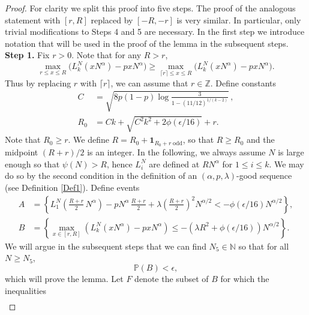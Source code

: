 	\begin{proof}
		
		For clarity we split this proof into five steps. The proof of the analogous statement with $[r,R]$ replaced by $[-R,-r]$ is very similar. In particular, only trivial modifications to Steps 4 and 5 are necessary. In the first step we introduce notation that will be used in the proof of the lemma in the subsequent steps.\\
		
		\noindent\textbf{Step 1.} Fix $r>0$. Note that for any $R>r$,
		\[
		\max_{r\leq x\leq R} \big(L_k^N(xN^\alpha) - pxN^\alpha\big) \geq \max_{\lceil r\rceil \leq x \leq R} \big(L_k^N(xN^\alpha) - pxN^\alpha\big).
		\]
		Thus by replacing $r$ with $\lceil r\rceil$, we can assume that $r\in\mathbb{Z}$. Define constants
		\begin{align}
		C &= \sqrt{ 8p(1-p) \log\frac{3}{1-(11/12)^{1/(k-2)}}}\,,\label{21Cdef}\\
		R_0 &= Ck+\sqrt{C^{2}k^{2}+2\phi(\epsilon/16)}+r. \label{21Rdef}
		\end{align}
		Note that $R_0\geq r$. We define $R = R_0 + \mathbf{1}_{R_0 + r\;\mathrm{odd}}$, so that $R\geq R_0$ and the midpoint $(R+r)/2$ is an integer. In the following, we always assume $N$ is large enough so that $\psi(N) > R$, hence $L_i^N$ are defined at $RN^\alpha$ for $1\leq i\leq k$. We may do so by the second condition in the definition of an $(\alpha,p,\lambda)$-good sequence (see Definition \ref{Def1}). Define events
		\begin{equation}\label{21AB}
		\begin{split}
		A &= \left\{L_1^N\left(\frac{R+r}{2}\,N^\alpha\right) - pN^\alpha\,\frac{R+r}{2} + \lambda\left(\frac{R+r}{2}\right)^2 N^{\alpha/2} < -\phi(\epsilon/16)N^{\alpha/2}\right\},\\
		B &= \left\{\max_{x\in[r,R]} \left(L_k^N(xN^\alpha) - pxN^\alpha\right) \leq -(\lambda R^2 + \phi(\epsilon/16)) N^{\alpha/2} \right\}.
		\end{split}
		\end{equation}
		We will argue in the subsequent steps that we can find $N_5\in\mathbb{N}$ so that for all $N\geq N_5$,
		\begin{equation}\label{21Bbound}
		\mathbb{P}(B) < \epsilon,
		\end{equation}
		which will prove the lemma. Let $F$ denote the subset of $B$ for which the inequalities
		\begin{equation}\label{21x1y1}
		\begin{split}

\end{split}
\end{equation}
\end{proof}
